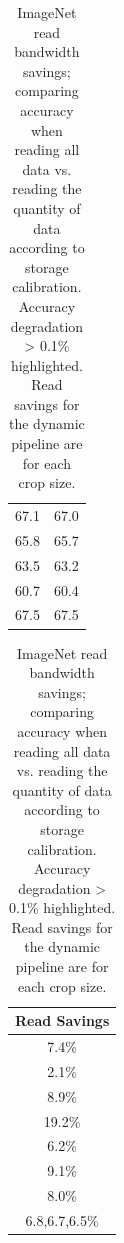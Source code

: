 \begin{table}[t]
\begin{tabular}{|c|c|}
    67.1 & 67.0 \\ 
    65.8 & 65.7\\ 
    63.5 & 63.2 \\ 
    60.7 & {\color{red} 60.4}\\
    67.5 & 67.5 \\ 
    \end{tabular}
    \begin{tabular}{|c}
    \\
    Read Savings \\
    \hline
    7.4\%\\ 
    2.1\%\\ 
    8.9\%\\ 
    19.2\%\\ 
    6.2\%\\ 
    9.1\%\\ 
    8.0\% \\
    6.8,6.7,6.5\%\\ 
    \end{tabular}
    \caption{ImageNet read bandwidth savings; comparing accuracy when reading all data vs. reading the quantity of data according to storage calibration. Accuracy degradation > 0.1\% highlighted. Read savings for the dynamic pipeline are for each crop size.
    }
    \label{tab:imagenet_storage}
\end{table}


